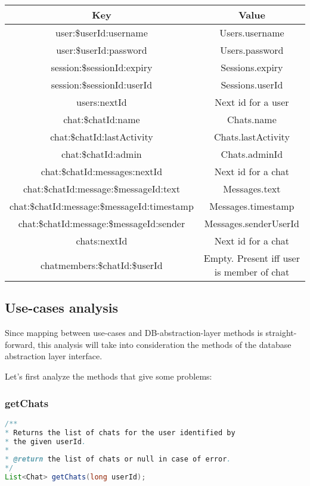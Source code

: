 \documentclass[10pt]{article}
\begin{document}
\begin{center}
\begin{tabular}{ | c | c | }
    \hline
    \textbf{Key} & \textbf{Value} \\\hline
    user:\$userId:username & Users.username \\\hline
    user:\$userId:password & Users.password \\\hline
    session:\$sessionId:expiry & Sessions.expiry \\\hline
    session:\$sessionId:userId & Sessions.userId \\\hline
    users:nextId & Next id for a user \\\hline
    chat:\$chatId:name & Chats.name \\\hline
    chat:\$chatId:lastActivity & Chats.lastActivity \\\hline
    chat:\$chatId:admin & Chats.adminId\\\hline
    chat:\$chatId:messages:nextId & Next id for a chat \\\hline
    chat:\$chatId:message:\$messageId:text & Messages.text \\\hline
    chat:\$chatId:message:\$messageId:timestamp & Messages.timestamp \\\hline
    chat:\$chatId:message:\$messageId:sender & Messages.senderUserId \\\hline
    chats:nextId & Next id for a chat \\\hline
    chatmembers:\$chatId:\$userId & Empty. Present iff user is member of chat \\\hline
\end{tabular}
\end{center}

\subsection{Use-cases analysis}
Since mapping between use-cases and DB-abstraction-layer methods is 
straight-forward, this analysis will take into consideration the 
methods of the database abstraction layer interface. 

Let's first analyze the methods that give some problems:

\subsubsection{getChats}

\begin{lstlisting}[language = Java]
/**
* Returns the list of chats for the user identified by 
* the given userId.
*
* @return the list of chats or null in case of error.
*/
List<Chat> getChats(long userId);
\end{lstlisting}
\end{document}
